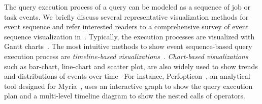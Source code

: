 The query execution process of a query can be modeled as a sequence of job or task events.
We briefly discuss several representative visualization methods for event sequence and refer interested readers to a comprehensive survey of event sequence visualization in~\cite{guo2021survey}. 
Typically, the execution processes are visualized with Gantt charts~\cite{tezui, sparkui, moritz2015perfopticon, battle2016making, sakin2022traveler}.
The most intuitive methods to show event sequence-based query execution process are \textit{timeline-based visualizations}~\cite{tezui, sparkui, moritz2015perfopticon, battle2016making, sakin2022traveler}.
\textit{Chart-based visualizations} such as bar-chart, line-chart and scatter plot, are also widely used to show trends and distributions of events over time~\cite{wu2020visual, malik2016high, gotz2019visual, sigovan2013visualizing, chen2014visual, micallef2017towards}
For instance, Perfopticon~\cite{moritz2015perfopticon}, an analytical tool designed for Myria~\cite{halperin2014demonstration}, uses an interactive graph to show the query execution plan and a multi-level timeline diagram to show the nested calls of operators.

